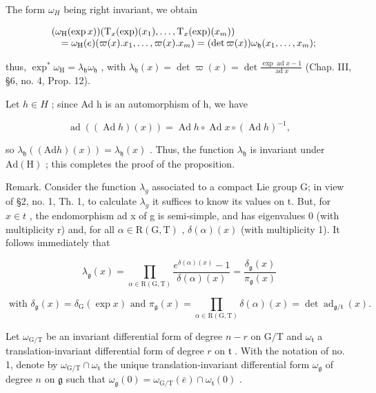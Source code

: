 The form \(\omega_{H}\) being right invariant, we obtain

\[
\begin{array}{r l} & (\omega_ {\mathrm{H}} (\exp x)) (\mathrm{T} _ {x} (\exp) (x _ {1}), \ldots , \mathrm{T} _ {x} (\exp) (x _ {m})) \\ & \quad = \omega_ {\mathrm{H}} (e) (\varpi (x). x _ {1}, \ldots , \varpi (x). x _ {m}) = (\det \varpi (x)) \omega_ {\mathfrak {h}} (x _ {1}, \ldots , x _ {m}); \end{array}
\]

thus, \(\exp^{*}\omega_{\mathrm{H}} = \lambda_{\mathfrak{h}}\omega_{\mathfrak{h}}\) , with \(\lambda_{\mathfrak{h}}(x) = \det \varpi(x) = \det \frac{\exp\operatorname{ad} x - 1}{\operatorname{ad} x}\) (Chap. III, §6, no. 4, Prop. 12).

Let \(h \in H\) ; since Ad h is an automorphism of h, we have

\[
\operatorname{ad} \left((\operatorname{Ad} h) (x)\right) = \operatorname{Ad} h \circ \operatorname{Ad} x \circ (\operatorname{Ad} h) ^ {- 1},
\]

so \(\lambda_{\mathfrak{h}}((\mathrm{Ad}h)(x)) = \lambda_{\mathfrak{h}}(x)\) . Thus, the function \(\lambda_{\mathfrak{h}}\) is invariant under \(\mathrm{Ad(H)}\) ; this completes the proof of the proposition.

Remark. Consider the function \(\lambda_{g}\) associated to a compact Lie group G; in view of §2, no. 1, Th. 1, to calculate \(\lambda_{g}\) it suffices to know its values on t. But, for \(x \in t\) , the endomorphism ad x of g is semi-simple, and has eigenvalues 0 (with multiplicity r) and, for all \(\alpha \in \mathrm{R}(\mathrm{G}, \mathrm{T})\) , \(\delta(\alpha)(x)\) (with multiplicity 1). It follows immediately that

\[
\lambda_ {\mathfrak {g}} (x) = \prod_ {\alpha \in \mathrm{R} (\mathrm{G}, \mathrm{T})} \frac {e ^ {\delta (\alpha) (x)} - 1}{\delta (\alpha) (x)} = \frac {\delta_ {\mathfrak {g}} (x)}{\pi_ {\mathfrak {g}} (x)}\tag{11}
\]

\[
\text { with } \delta_ {\mathfrak {g}} (x) = \delta_ {\mathrm{G}} (\exp x) \text { and } \pi_ {\mathfrak {g}} (x) = \prod_ {\alpha \in \mathrm{R} (\mathrm{G}, \mathrm{T})} \delta (\alpha) (x) = \det \operatorname{ad} _ {\mathfrak {g} / \mathfrak {t}} (x).
\]

Let \(\omega_{\mathrm{G / T}}\) be an invariant differential form of degree \(n - r\) on \(\mathrm{G / T}\) and \(\omega_{\mathfrak{t}}\) a translation-invariant differential form of degree \(r\) on \(\mathfrak{t}\) . With the notation of no. 1, denote by \(\omega_{\mathrm{G / T}} \cap \omega_{\mathfrak{t}}\) the unique translation-invariant differential form \(\omega_{\mathfrak{g}}\) of degree \(n\) on \(\mathfrak{g}\) such that \(\omega_{\mathfrak{g}}(0) = \omega_{\mathrm{G / T}}(\bar{e}) \cap \omega_{\mathfrak{t}}(0)\) .

